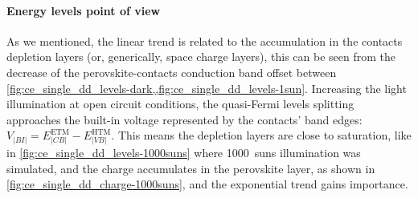 		\paragraph{Energy levels point of view}\label{ce_energy_levels}
		As we mentioned, the linear trend is related to the accumulation in the contacts depletion layers (or, generically, space charge layers), this can be seen from the decrease of the perovskite\hyp{}contacts conduction band offset between \cref{fig:ce_single_dd_levels-dark,,fig:ce_single_dd_levels-1sun}.
		Increasing the light illumination at open circuit conditions, the quasi\hyp{}Fermi levels splitting approaches the built\hyp{}in voltage represented by the contacts' band edges: $V_|BI| = E_|CB|^{\mathrm{ETM}} - E_|VB|^{\mathrm{HTM}}$.
		This means the depletion layers are close to saturation, like in \cref{fig:ce_single_dd_levels-1000suns} where \SI{1000}{suns} illumination was simulated, and the charge accumulates in the perovskite layer, as shown in \cref{fig:ce_single_dd_charge-1000suns}, and the exponential trend gains importance.

		\begin{figure}
		\end{figure}

